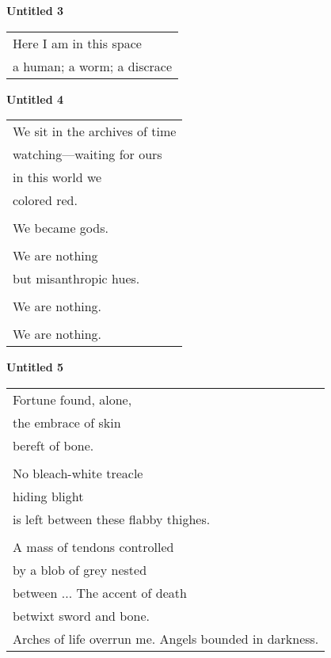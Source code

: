 \documentclass{article}
\begin{document}

\begin{center}
\textbf{Untitled 3} \\
\vspace*{2ex}
\begin{tabular}{l}
Here I am in this space \\
a human; a worm; a discrace \\
 
\end{tabular}
\end{center}

\begin{center}
\textbf{Untitled 4} \\
\vspace*{2ex}
\begin{tabular}{l}
We sit in the archives of time \\
watching---waiting for ours \\
in this world we \\
colored red. \\
\\
We became gods. \\
\\
We are nothing \\
but misanthropic hues. \\
\\
We are nothing. \\
\\
We are nothing. \\
\end{tabular}
\end{center}

\begin{center}
\textbf{Untitled 5} \\
\vspace*{2ex}
\begin{tabular}{l}
Fortune found, alone, \\
the embrace of skin \\
bereft of bone. \\
\\
No bleach-white treacle \\
hiding blight \\
is left between these flabby thighes. \\
\\
A mass of tendons controlled \\
by a blob of grey nested \\
between ...
%
%
%
The accent of death \\
betwixt sword and bone. \\
%
Arches of life overrun me.
Angels bounded in darkness.
\end{tabular}
\end{center}
\end{document}
